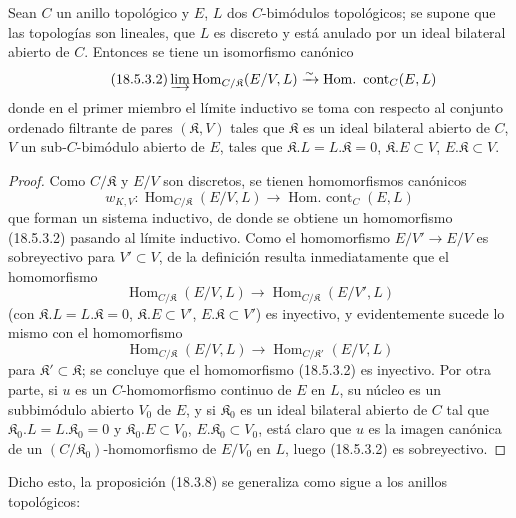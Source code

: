 \begin{lemma}[18.5.3.1]
\label{0.18.5.3.1-es}
Sean $C$ un anillo topológico y $E$, $L$ dos $C$-bimódulos topológicos;
se supone que las topologías son lineales, que $L$ es discreto y está anulado
por un ideal bilateral abierto de $C$. Entonces se tiene un isomorfismo canónico
\begin{equation}
\label{0.18.5.3.2-es}
\tag{18.5.3.2}
  \varinjlim\operatorname{Hom}_{C/\mathfrak K}(E/V,L)
  \xrightarrow{\sim}\operatorname{Hom.\ cont}_C(E,L)
\end{equation}
donde en el primer miembro el límite inductivo se toma con respecto al conjunto
ordenado filtrante de pares $(\mathfrak K,V)$ tales que $\mathfrak K$ es un
ideal bilateral abierto de $C$, $V$ un sub-$C$-bimódulo abierto de $E$, tales que
$\mathfrak K.L=L.\mathfrak K=0$, $\mathfrak K.E\subset V$,
$E.\mathfrak K\subset V$.
\end{lemma}

\begin{proof}
Como $C/\mathfrak K$ y $E/V$ son discretos, se tienen homomorfismos
canónicos
\[
  w_{K,V}:\operatorname{Hom}_{C/\mathfrak K}(E/V,L)
  \longrightarrow\operatorname{Hom.\ cont}_C(E,L)
\]
que forman un sistema inductivo, de donde se obtiene un homomorfismo (18.5.3.2) pasando al
límite inductivo. Como el homomorfismo $E/V'\to E/V$ es sobreyectivo para
$V'\subset V$, de la definición resulta inmediatamente que el homomorfismo
\[
  \operatorname{Hom}_{C/\mathfrak K}(E/V,L)
  \longrightarrow\operatorname{Hom}_{C/\mathfrak K}(E/V',L)
\]
(con $\mathfrak K.L=L.\mathfrak K=0$, $\mathfrak K.E\subset V'$,
$E.\mathfrak K\subset V'$) es inyectivo, y evidentemente sucede lo mismo con
el homomorfismo
\[
  \operatorname{Hom}_{C/\mathfrak K}(E/V,L)
  \longrightarrow\operatorname{Hom}_{C/\mathfrak K'}(E/V,L)
\]
para $\mathfrak K'\subset\mathfrak K$; se concluye que el homomorfismo
(18.5.3.2) es inyectivo. Por otra parte, si $u$ es un $C$-homomorfismo continuo
de $E$ en $L$, su núcleo es un subbimódulo abierto $V_0$ de $E$, y si
$\mathfrak K_0$ es un ideal bilateral abierto de $C$ tal que
$\mathfrak K_0.L=L.\mathfrak K_0=0$ y $\mathfrak K_0.E\subset V_0$,
$E.\mathfrak K_0\subset V_0$, está claro que $u$ es la imagen canónica de un
$(C/\mathfrak K_0)$-homomorfismo de $E/V_0$ en $L$, luego (18.5.3.2) es
sobreyectivo.
\end{proof}

Dicho esto, la proposición (18.3.8) se generaliza como sigue a los anillos
topológicos:

